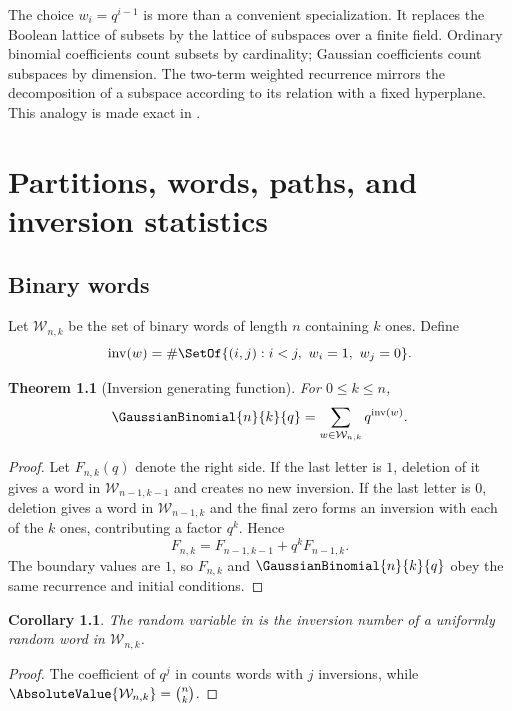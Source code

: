 \documentclass[11pt,a4paper,oneside,openany]{book}
\newtheorem{theorem}{Theorem}[chapter]
\newtheorem{corollary}[corollary]{Corollary}
\theoremstyle{definition}
\theoremstyle{remark}
\newcommand{\inv}{\operatorname{inv}}
\begin{document}
The choice $w_i=q^{i-1}$ is more than a convenient specialization.  It replaces the Boolean lattice of subsets by the lattice of subspaces over a finite field.  Ordinary binomial coefficients count subsets by cardinality; Gaussian coefficients count subspaces by dimension.  The two-term weighted recurrence mirrors the decomposition of a subspace according to its relation with a fixed hyperplane.  This analogy is made exact in .

\chapter{Partitions, words, paths, and inversion statistics}\label{chap:combinatorics}

\section{Binary words}

Let $\mathcal W_{n,k}$ be the set of binary words of length $n$ containing $k$ ones.  Define
\[
 \inv(w)=\#\SetOf{(i,j):i<j,\ w_i=1,\ w_j=0}.
\]

\begin{theorem}[Inversion generating function]\label{thm:binary-inversions}
For $0\le k\le n$,
\[
 \GaussianBinomial{n}{k}{q}=\sum_{w\in\mathcal W_{n,k}}q^{\inv(w)}.
\]
\end{theorem}

\begin{proof}
Let $F_{n,k}(q)$ denote the right side.  If the last letter is $1$, deletion of it gives a word in $\mathcal W_{n-1,k-1}$ and creates no new inversion.  If the last letter is $0$, deletion gives a word in $\mathcal W_{n-1,k}$ and the final zero forms an inversion with each of the $k$ ones, contributing a factor $q^k$.  Hence
\[
 F_{n,k}=F_{n-1,k-1}+q^kF_{n-1,k}.
\]
The boundary values are $1$, so $F_{n,k}$ and $\GaussianBinomial{n}{k}{q}$ obey the same recurrence and initial conditions.
\end{proof}

\begin{corollary}
The random variable in  is the inversion number of a uniformly random word in $\mathcal W_{n,k}$.
\end{corollary}

\begin{proof}
The coefficient of $q^j$ in  counts words with $j$ inversions, while $\AbsoluteValue{\mathcal W_{n,k}}=\binom nk$.
\end{proof}
\end{document}
